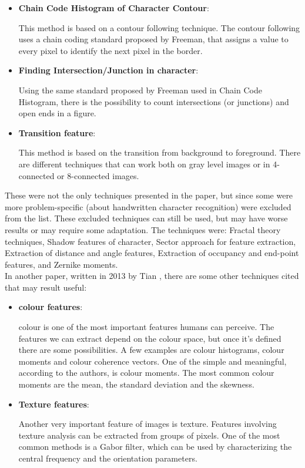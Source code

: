 \documentclass[conference]{IEEEtran}
\begin{document}
\begin{itemize}
						\item \textbf{Chain Code Histogram of Character Contour}:
						
							This method is based on a contour following technique. 
							The contour following uses a chain coding standard proposed by Freeman, that assigns a value to every pixel to identify the next pixel in the border.

						\item \textbf{Finding Intersection/Junction in character}:
						
							Using the same standard proposed by Freeman used in Chain Code Histogram, there is the possibility to count intersections (or junctions) and open ends in a figure.					
							
						\item \textbf{Transition feature}:
						
							This method is based on the transition from background to foreground. 
							There are different techniques that can work both on gray level images or in 4-connected or 8-connected images.
						
					\end{itemize}
				
				
				\noindent These were not the only techniques presented in the paper, but since some were more problem-specific (about handwritten character recognition)
				were excluded from the list. These excluded techniques can still be used, but may have worse results or may require some adaptation. 
				The techniques were: Fractal theory techniques, Shadow features of character, Sector approach for feature extraction, 
				Extraction of distance and angle features, Extraction of occupancy and end-point features, and Zernike moments.\\
				In another paper, written in 2013 by Tian \cite{ping2013review}, there are some other techniques cited that may result useful:
				
				\begin{itemize}
				
					\item \textbf{colour features}:
						
						colour is one of the most important features humans can perceive. 
						The features we can extract depend on the colour space, but once it's defined there are some possibilities. 
						A few examples are colour histograms, colour moments and colour coherence vectors. 
						One of the simple and meaningful, according to the authors, is colour moments. 
						The most common colour moments are the mean, the standard deviation and the skewness. 
						
					\item \textbf{Texture features}:
					
						Another very important feature of images is texture. 
						Features involving texture analysis can be extracted from groups of pixels. 
						One of the most common methods is a Gabor filter, which can be used by characterizing the central frequency and the orientation parameters.
				
				\end{itemize}
				
\end{document}
